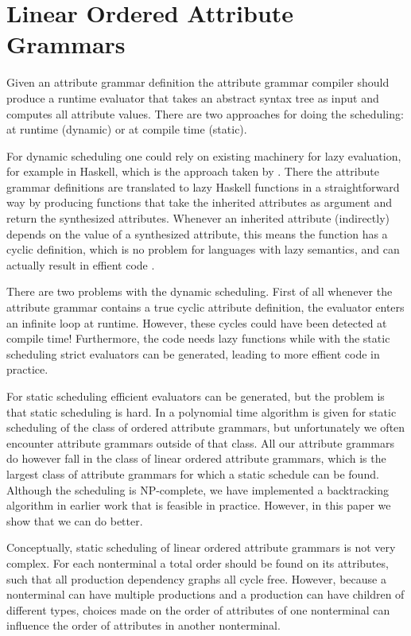 \documentclass{llncs}
\begin{document}
\section{Linear Ordered Attribute Grammars} \label{sect:loag}
Given an attribute grammar definition the attribute grammar compiler should produce a runtime evaluator that takes an abstract syntax tree as input and computes all attribute values. There are two approaches for doing the scheduling: at runtime (dynamic) or at compile time (static).

For dynamic scheduling one could rely on existing machinery for lazy evaluation, for example in Haskell, which is the approach taken by \cite{saraiva99}. There the attribute grammar definitions are translated to lazy Haskell functions in a straightforward way by producing functions that take the inherited attributes as argument and return the synthesized attributes. Whenever an inherited attribute (indirectly) depends on the value of a synthesized attribute, this means the function has a cyclic definition, which is no problem for languages with lazy semantics, and can actually result in effient code \cite{Bird:1984}.

There are two problems with the dynamic scheduling. First of all whenever the attribute grammar contains a true cyclic attribute definition, the evaluator enters an infinite loop at runtime. However, these cycles could have been detected at compile time! Furthermore, the code needs lazy functions while with the static scheduling strict evaluators can be generated, leading to more effient code in practice.

For static scheduling efficient evaluators can be generated, but the problem is that static scheduling is hard. In \cite{kastens80} a polynomial time algorithm is given for static scheduling of the class of ordered attribute grammars, but unfortunately we often encounter attribute grammars outside of that class. All our attribute grammars do however fall in the class of linear ordered attribute grammars, which is the largest class of attribute grammars for which a static schedule can be found. Although the scheduling is NP-complete, we have implemented a backtracking algorithm in earlier work \cite{Binsbergen:2015} that is feasible in practice. However, in this paper we show that we can do better.

Conceptually, static scheduling of linear ordered attribute grammars is not very complex. For each nonterminal a total order should be found on its attributes, such that all production dependency graphs all cycle free. However, because a nonterminal can have multiple productions and a production can have children of different types, choices made on the order of attributes of one nonterminal can influence the order of attributes in another nonterminal.
\end{document}
